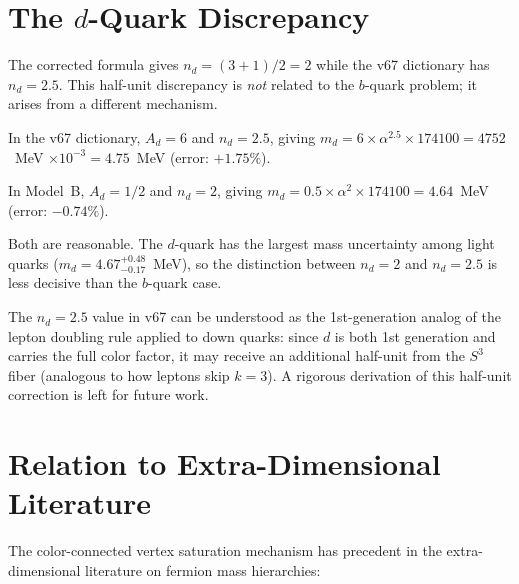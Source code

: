 \documentclass[11pt,a4paper]{article}
\theoremstyle{definition}
\theoremstyle{remark}
\begin{document}
\section{The $d$-Quark Discrepancy}
\label{sec:d-quark}

The corrected formula gives $n_d = (3+1)/2 = 2$ while the v67 dictionary
has $n_d = 2.5$.  This half-unit discrepancy is \emph{not} related to
the $b$-quark problem; it arises from a different mechanism.

In the v67 dictionary, $A_d = 6$ and $n_d = 2.5$, giving
$m_d = 6 \times \alpha^{2.5} \times 174100 = 4752$~MeV $\times 10^{-3}
= 4.75$~MeV (error: $+1.75\%$).

In Model~B, $A_d = 1/2$ and $n_d = 2$, giving
$m_d = 0.5 \times \alpha^2 \times 174100 = 4.64$~MeV (error: $-0.74\%$).

Both are reasonable.  The $d$-quark has the largest mass uncertainty
among light quarks ($m_d = 4.67^{+0.48}_{-0.17}$~MeV), so the distinction
between $n_d = 2$ and $n_d = 2.5$ is less decisive than the $b$-quark case.

The $n_d = 2.5$ value in v67 can be understood as the 1st-generation
analog of the lepton doubling rule applied to down quarks: since $d$ is
both 1st generation and carries the full color factor, it may receive an
additional half-unit from the $S^3$ fiber (analogous to how leptons skip
$k = 3$).  A rigorous derivation of this half-unit correction is left for
future work.

\section{Relation to Extra-Dimensional Literature}
\label{sec:literature}

The color-connected vertex saturation mechanism has precedent in the
extra-dimensional literature on fermion mass hierarchies:
\end{document}
